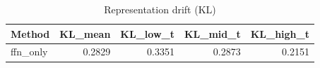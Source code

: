 \begin{table}[htbp]
\centering
\caption{Representation drift (KL)}
\label{tab:repr-drift}
\begin{tabular}{lrrrr}
\toprule
\textbf{Method} & \textbf{KL\_mean} & \textbf{KL\_low\_t} & \textbf{KL\_mid\_t} & \textbf{KL\_high\_t} \\
\midrule
ffn\_only & 0.2829 & 0.3351 & 0.2873 & 0.2151 \\
\bottomrule
\end{tabular}
\end{table}